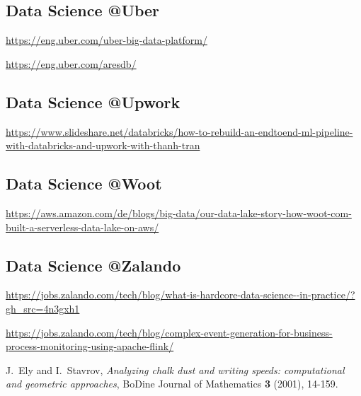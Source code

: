 \documentclass[12pt]{scrartcl} %
\begin{document}
\subsection{Data Science @Uber}
\url{https://eng.uber.com/uber-big-data-platform/}

\url{https://eng.uber.com/aresdb/}

\subsection{Data Science @Upwork}
\url{https://www.slideshare.net/databricks/how-to-rebuild-an-endtoend-ml-pipeline-with-databricks-and-upwork-with-thanh-tran}

\subsection{Data Science @Woot}
\url{https://aws.amazon.com/de/blogs/big-data/our-data-lake-story-how-woot-com-built-a-serverless-data-lake-on-aws/}

\subsection{Data Science @Zalando}
\url{https://jobs.zalando.com/tech/blog/what-is-hardcore-data-science--in-practice/?gh_src=4n3gxh1}

\url{https://jobs.zalando.com/tech/blog/complex-event-generation-for-business-process-monitoring-using-apache-flink/}

 
\newpage

\begin{thebibliography}{99}
 
J.~Ely and I.~Stavrov, 
\emph{Analyzing chalk dust and writing speeds: computational and geometric approaches},
BoDine Journal of Mathematics \textbf{3} (2001), 14-159. 
 
\end{thebibliography}


\listoffigures%
\listoftables%
\end{document}
